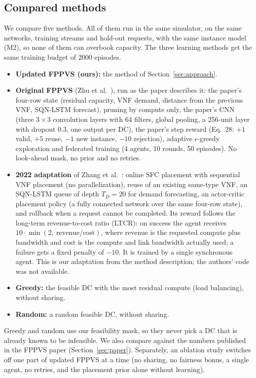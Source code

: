 \documentclass[11pt,a4paper]{article}
\begin{document}
\subsection{Compared methods}
We compare five methods. All of them run in the same simulator, on the same
networks, training streams and hold-out requests, with the same instance model
(M2), so none of them can overbook capacity. The three learning methods get the
same training budget of 2000 episodes.
\begin{itemize}
  \item \textbf{Updated FPPVS (ours):} the method of Section~\ref{sec:approach}.
  \item \textbf{Original FPPVS} (Zhu et al.~\cite{fppvs}), run as the paper
  describes it: the paper's four-row state (residual capacity, VNF demand,
  distance from the previous VNF, SQN-LSTM forecast), pruning by compute only,
  the paper's CNN (three $3\times3$ convolution layers with 64 filters, global
  pooling, a 256-unit layer with dropout 0.3, one output per DC), the paper's
  step reward (Eq.~28: $+1$ valid, $+5$ reuse, $-1$ new instance, $-10$
  rejection), adaptive $\epsilon$-greedy exploration and federated training
  (4 agents, 10 rounds, 50 episodes). No look-ahead mask, no prior and no
  retries.
  \item \textbf{2022 adaptation} of Zhang et al.~\cite{zhang2022}: online SFC
  placement with sequential VNF placement (no parallelization), reuse of an
  existing same-type VNF, an SQN-LSTM queue of depth $T_D=20$ for demand
  forecasting, an actor-critic placement policy (a fully connected network over
  the same four-row state), and rollback when a request cannot be completed.
  Its reward follows the long-term revenue-to-cost ratio (LTCR): on success the
  agent receives $10\cdot\min(2,\ \text{revenue}/\text{cost})$, where revenue is
  the requested compute plus bandwidth and cost is the compute and link
  bandwidth actually used; a failure gets a fixed penalty of $-10$. It is
  trained by a single synchronous agent. This is our adaptation from the
  method description; the authors' code was not available.
  \item \textbf{Greedy:} the feasible DC with the most residual compute (load
  balancing), without sharing.
  \item \textbf{Random:} a random feasible DC, without sharing.
\end{itemize}
Greedy and random use our feasibility mask, so they never pick a DC that is
already known to be infeasible. We also compare against the numbers published in
the FPPVS paper (Section~\ref{sec:paper}). Separately, an ablation study switches
off one part of updated FPPVS at a time (no sharing, no fairness bonus, a single
agent, no retries, and the placement prior alone without learning).
\end{document}
